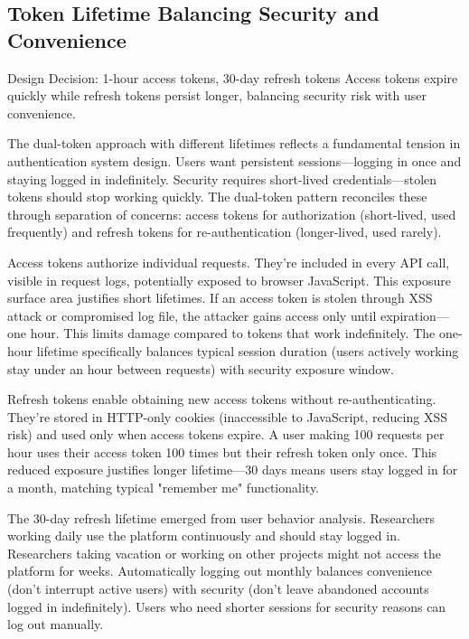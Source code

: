 \documentclass[12pt,a4paper]{article}
\begin{document}
\subsection{Token Lifetime Balancing Security and Convenience}

\begin{rationale}{Design Decision: 1-hour access tokens, 30-day refresh tokens}
Access tokens expire quickly while refresh tokens persist longer, balancing security risk with user convenience.
\end{rationale}

The dual-token approach with different lifetimes reflects a fundamental tension in authentication system design. Users want persistent sessions—logging in once and staying logged in indefinitely. Security requires short-lived credentials—stolen tokens should stop working quickly. The dual-token pattern reconciles these through separation of concerns: access tokens for authorization (short-lived, used frequently) and refresh tokens for re-authentication (longer-lived, used rarely).

Access tokens authorize individual requests. They're included in every API call, visible in request logs, potentially exposed to browser JavaScript. This exposure surface area justifies short lifetimes. If an access token is stolen through XSS attack or compromised log file, the attacker gains access only until expiration—one hour. This limits damage compared to tokens that work indefinitely. The one-hour lifetime specifically balances typical session duration (users actively working stay under an hour between requests) with security exposure window.

Refresh tokens enable obtaining new access tokens without re-authenticating. They're stored in HTTP-only cookies (inaccessible to JavaScript, reducing XSS risk) and used only when access tokens expire. A user making 100 requests per hour uses their access token 100 times but their refresh token only once. This reduced exposure justifies longer lifetime—30 days means users stay logged in for a month, matching typical "remember me" functionality.

The 30-day refresh lifetime emerged from user behavior analysis. Researchers working daily use the platform continuously and should stay logged in. Researchers taking vacation or working on other projects might not access the platform for weeks. Automatically logging out monthly balances convenience (don't interrupt active users) with security (don't leave abandoned accounts logged in indefinitely). Users who need shorter sessions for security reasons can log out manually.
\end{document}
